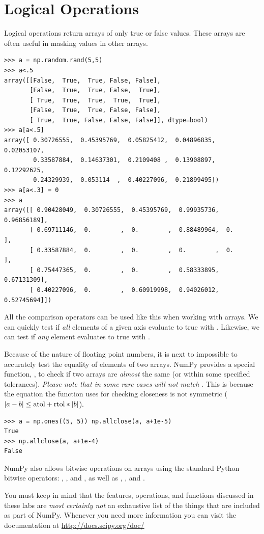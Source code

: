 \section*{Logical Operations} 
Logical operations return arrays of only true or false values. 
These arrays are often useful in masking values in other arrays. 

\begin{lstlisting}
>>> a = np.random.rand(5,5) 
>>> a<.5
array([[False,  True,  True, False, False],
       [False,  True,  True, False,  True],
       [ True,  True,  True,  True,  True],
       [False,  True,  True, False, False],
       [ True,  True, False, False, False]], dtype=bool)
>>> a[a<.5]
array([ 0.30726555,  0.45395769,  0.05825412,  0.04896835,  0.02053107,
        0.33587884,  0.14637301,  0.2109408 ,  0.13908897,  0.12292625,
        0.24329939,  0.053114  ,  0.40227096,  0.21899495])
>>> a[a<.3] = 0 
>>> a
array([[ 0.90428049,  0.30726555,  0.45395769,  0.99935736,  0.96856189],
       [ 0.69711146,  0.        ,  0.        ,  0.88489964,  0.        ],
       [ 0.33587884,  0.        ,  0.        ,  0.        ,  0.        ],
       [ 0.75447365,  0.        ,  0.        ,  0.58333895,  0.67131309],
       [ 0.40227096,  0.        ,  0.60919998,  0.94026012,  0.52745694]])
\end{lstlisting} 
All the comparison operators can be used like this when working with arrays. 
We can quickly test if \emph{all} elements of a given axis
evaluate to true with .  
Likewise, we can test if \emph{any} element evaluates to true with 
. 

Because of the nature of floating
point numbers, it is next to impossible to accurately test the equality
of elements of two arrays. NumPy provides a special function,
, to check if two arrays are \emph{almost} the same (or
within some specified tolerances). \emph{Please note that in some rare
cases}  \emph{will not match} . This is because the equation the function uses for checking
closeness is not symmetric ($\left\lvert a-b\right\rvert \leq \mbox{atol} +
\mbox{rtol}*\left\lvert b\right\rvert$). \begin{lstlisting}
>>> a = np.ones((5, 5)) np.allclose(a, a+1e-5)
True
>>> np.allclose(a, a+1e-4)
False \end{lstlisting} NumPy also allows bitwise operations on arrays
using the standard Python bitwise operators: \li{&}, \li{|}, and \li{^},
as well as \li{&=}, \li{|=}, and \li{^=}.


You must keep in mind that the features, operations, and functions
discussed in these labs are \emph{most certainly not} an exhaustive list
of the things that are included as part of NumPy. Whenever you need more
information you can visit the documentation at
\url{http://docs.scipy.org/doc/}

